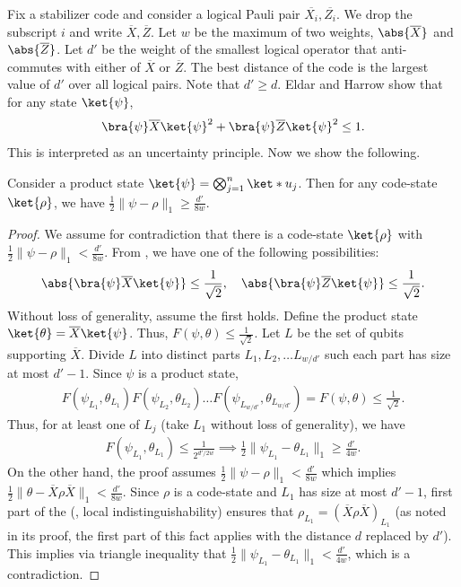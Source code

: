 \documentclass{toc}
\begin{document}
Fix a stabilizer code and consider a logical Pauli pair $\overline{X_i},\overline{Z_i}$. We drop the subscript $i$ and write $\overline{X},\overline{Z}$.
%
%
%
%
Let $w$ be the maximum of two weights, $\abs{\overline{X}}$ and $\abs{\overline{Z}}$. 
Let $d'$ be the weight of the smallest logical operator that anti-commutes with either of $\overline{X}$ or $\overline{Z}$. The best distance of the code is the largest value of $d'$ over all logical pairs. Note that $d'\geq d$. Eldar and Harrow \cite[Section 4: Lemma 37]{8104078} show that for any state $\ket{\psi}$, 
\begin{equation}
\label{eq:uncertainty}
\bra{\psi}\overline{X}\ket{\psi}^2 + \bra{\psi}\overline{Z}\ket{\psi}^2 \leq 1.
\end{equation} 
This is interpreted as an uncertainty principle. Now we show the following.
\begin{lemma}
Consider a product state $\ket{\psi}= \bigotimes_{j = 1}^n \ket*{u_j}$. Then for any code-state $\ket{\rho}$, we have $\frac{1}{2}\|\psi-\rho\|_1\geq \frac{d'}{8w}$.
\end{lemma}
\begin{proof}
We assume for contradiction that there is a code-state $\ket{\rho}$ with $\frac{1}{2}\|\psi-\rho\|_1< \frac{d'}{8w}$.  From  %
, we have one of the following possibilities:
\begin{align}
\abs{\bra{\psi}\overline{X}\ket{\psi}}\leq \frac{1}{\sqrt{2}}, \quad \abs{\bra{\psi}\overline{Z}\ket{\psi}}\leq \frac{1}{\sqrt{2}}.    
\end{align}
Without loss of generality, assume the first holds.  Define the product state $\ket{\theta}=\overline{X}\ket{\psi}$. Thus, $F(\psi, \theta)\leq \frac{1}{\sqrt{2}}$. Let $L$ be the set of qubits supporting $\overline{X}$. Divide $L$ into distinct parts $L_1,L_2, \ldots L_{w/d'}$ such each part has size at most $d'-1$. Since $\psi$ is a product state, 
\begin{align}F(\psi_{L_1}, \theta_{L_1})F(\psi_{L_2}, \theta_{L_2})\ldots F(\psi_{L_{w/d'}}, \theta_{L_{w/d'}})=F(\psi, \theta)\leq \frac{1}{\sqrt{2}}.
\end{align} 
Thus, for at least one of $L_j$ (take $L_1$ without loss of generality), we have
\begin{align}F(\psi_{L_1}, \theta_{L_1})\leq \frac{1}{2^{d'/2w}}\implies \frac{1}{2}\|\psi_{L_1}- \theta_{L_1}\|_1 \geq \frac{d'}{4w}.
\end{align}
On the other hand, the proof assumes $\frac{1}{2}\|\psi-\rho\|_1< \frac{d'}{8w}$ which implies $\frac{1}{2}\|\theta-\overline{X}\rho \overline{X}\|_1< \frac{d'}{8w}$. Since $\rho$ is a code-state and $L_1$ has size at most $d'-1$, first part of the  (\ie, local indistinguishability) ensures that $\rho_{L_1}=(\overline{X}\rho \overline{X})_{L_1}$ (as noted in its proof, the first part of this fact applies with the distance $d$ replaced by $d'$). This implies via triangle inequality that $\frac{1}{2}\|\psi_{L_1}-\theta_{L_1}\|_1< \frac{d'}{4w}$, which is a contradiction.
\end{proof}
\end{document}
